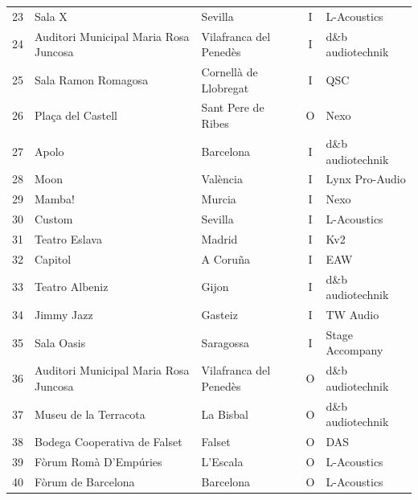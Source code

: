 \begin{longtable}{@{}r p{3.3cm} p{2.5cm} c p{3.0cm}@{}}
23 & Sala X & Sevilla & I & L-Acoustics \\
24 & Auditori Municipal Maria Rosa Juncosa & Vilafranca del Penedès & I & d\&b audiotechnik \\
25 & Sala Ramon Romagosa & Cornellà de Llobregat & I & QSC \\
26 & Plaça del Castell & Sant Pere de Ribes & O & Nexo \\
27 & Apolo & Barcelona & I & d\&b audiotechnik \\
28 & Moon & València & I & Lynx Pro-Audio \\
29 & Mamba! & Murcia & I & Nexo \\
30 & Custom & Sevilla & I & L-Acoustics \\
31 & Teatro Eslava & Madrid & I & Kv2 \\
32 & Capitol & A Coruña & I & EAW \\
33 & Teatro Albeniz & Gijon & I & d\&b audiotechnik \\
34 & Jimmy Jazz & Gasteiz & I & TW Audio \\
35 & Sala Oasis & Saragossa & I & Stage Accompany \\
36 & Auditori Municipal Maria Rosa Juncosa & Vilafranca del Penedès & O & d\&b audiotechnik \\
37 & Museu de la Terracota & La Bisbal & O & d\&b audiotechnik \\
38 & Bodega Cooperativa de Falset & Falset & O & DAS \\
39 & Fòrum Romà D'Empúries & L'Escala & O & L-Acoustics \\
40 & Fòrum de Barcelona & Barcelona & O & L-Acoustics \\
\end{longtable}

